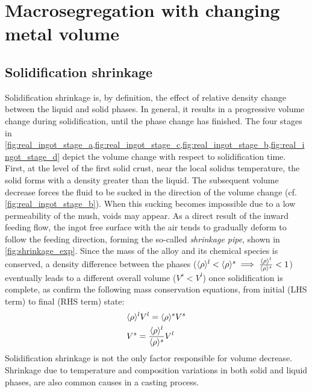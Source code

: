 \chapter{Macrosegregation with changing metal volume}
\begin{nolinkcolors} 
\minitoc
\end{nolinkcolors}
\newpage

\section{Solidification shrinkage}

Solidification shrinkage is, by definition, the effect of relative density change between the liquid and solid phases.
In general, it results in a progressive volume change during solidification, until the phase change has finished. 
The four stages in \cref{fig:real_ingot_stage_a,fig:real_ingot_stage_c,fig:real_ingot_stage_b,fig:real_ingot_stage_d} depict the volume change with 
respect to solidification time.
First, at the level of the first solid crust, near the local solidus temperature, the solid forms with a density greater than 
the liquid. The subsequent volume decrease forces the fluid to be sucked in the direction of the volume change 
(cf. \cref{fig:real_ingot_stage_b}). 
When this sucking becomes impossible due to a low permeability of the mush, voids may appear.
As a direct result of the inward feeding flow, the ingot free surface with the air
tends to gradually deform to follow the feeding direction, forming the so-called \emph{shrinkage pipe}, shown in \cref{fig:shrinkage_exp}. 
Since the mass of the alloy and its chemical species is conserved, 
a density difference between the phases ($\langle \rho \rangle^l < \langle \rho \rangle^s \implies \frac{\langle \rho \rangle^l}{\langle \rho \rangle^s}<1$) eventually leads 
to a different overall volume ($V^s<V^l$) once solidification is complete, as confirm the following mass conservation equations, 
from initial (LHS term) to final (RHS term) state:
\begin{subequations}
\begin{align}
& \langle \rho \rangle^l V^l = \langle \rho \rangle^s V^s  \\ 
& V^s = \frac{\langle \rho \rangle^l}{\langle \rho \rangle^s} V^l
\end{align}
\end{subequations}
Solidification shrinkage is not the only factor responsible for volume decrease. 
Shrinkage due to temperature and composition variations in both solid and liquid phases, are also common causes in a casting process. 
